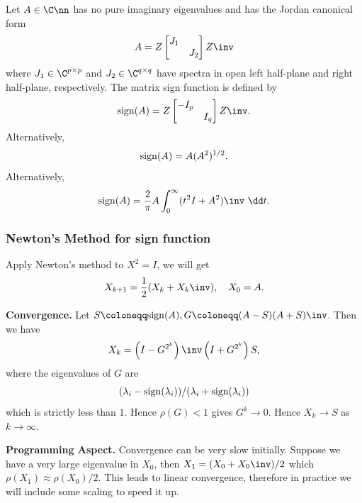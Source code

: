\documentclass{article}
\def\sign{\mathrm{sign}}
\begin{document}
Let $A\in\C\nn$ has no pure imaginary eigenvalues and has the Jordan
canonical form 
\begin{equation}\notag
    A = Z \begin{bmatrix}
        J_1 & \\ & J_2
    \end{bmatrix}
    Z\inv
\end{equation}
where $J_1\in\C^{p\times p}$ and $J_2 \in \C^{q\times q}$ have spectra
in open left half-plane and right half-plane, respectively. The matrix
sign function is defined by 
\begin{equation}\notag
    \sign(A)  = Z \begin{bmatrix}
        -I_p & \\ & I_q
    \end{bmatrix}
    Z\inv.
\end{equation}
Alternatively,
\begin{equation}\notag
    \sign(A) = A(A^2)^{1/2}.
\end{equation}
Alternatively,
\begin{equation}
    \sign(A) = \frac{2}{\pi}A \int_0^\infty (t^2 I  + A^2)\inv~\dd t.
\end{equation}

\subsubsection{Newton's Method for sign function}
Apply Newton's method to $X^2 = I$, we will get 
\begin{equation}\notag
    X_{k+1} = \frac{1}{2}(X_k + X_k\inv), \quad X_0 = A.
\end{equation}

\textbf{Convergence.} Let $S \coloneqq \sign(A), G \coloneqq (A - S)(A +
S)\inv$. Then we have 
\begin{equation}\notag
    X_k = \left(I - G^{2^k}\right)\inv \left(I + G^{2^k}\right) S,
\end{equation}
where the eigenvalues of $G$ are 
\begin{equation}\notag
    (\lambda_i - \sign(\lambda_i))/(\lambda_i + \sign(\lambda_i))
\end{equation}
which is strictly less than $1$. Hence $\rho(G)<1$ gives $G^k \to 0$.
Hence $X_k \to S$ as $k\to\infty$.

\textbf{Programming Aspect.} Convergence can be very slow initially.
Suppose we have a very large eigenvalue in $X_0$, then $X_1 = (X_0 +
X_0\inv)/2$ which $\rho(X_1)\approx \rho(X_0)/2$. This leads to linear
convergence, therefore in practice we will include some scaling to speed
it up.
\end{document}
